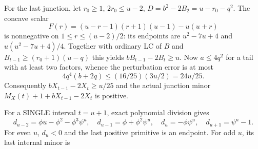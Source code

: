 For the last junction, let $r_0\ge1$, $2r_0\le u-2$,
$D=b^2-2B_2=u-r_0-q^2$. The concave scalar
\[
 F(r)=(u-r-1)(r+1)(u-1)-u(u+r)
\]
is nonnegative on $1\le r\le(u-2)/2$: its endpoints are
$u^2-7u+4$ and $u(u^2-7u+4)/4$.
Together with ordinary LC of $B$ and
$B_{t-1}\ge(r_0+1)(u-q)$ this yields
$bB_{t-1}-2B_t\ge u$.
Now $a\le4q^2$ for a tail with at least two factors, whence
the perturbation error is at most
\[
 4q^4(b+2q)\le(16/25)(3u/2)=24u/25.
\]
Consequently $bX_{t-1}-2X_t\ge u/25$ and the actual junction
minor $M_X(t)+1+bX_{t-1}-2X_t$ is positive.

For a SINGLE interval $t=u+1$, exact polynomial division gives
\[
 d_{u-2}=\phi u-\phi^2-\phi^3\psi^u,\quad
 d_{u-1}=\phi+\phi^2\psi^u,\quad
 d_u=-\phi\psi^u,\quad d_{u+1}=\psi^u-1.             \tag{4}
\]
For even $u$, $d_u<0$ and the last positive primitive is an endpoint.
For odd $u$, its last internal minor is
